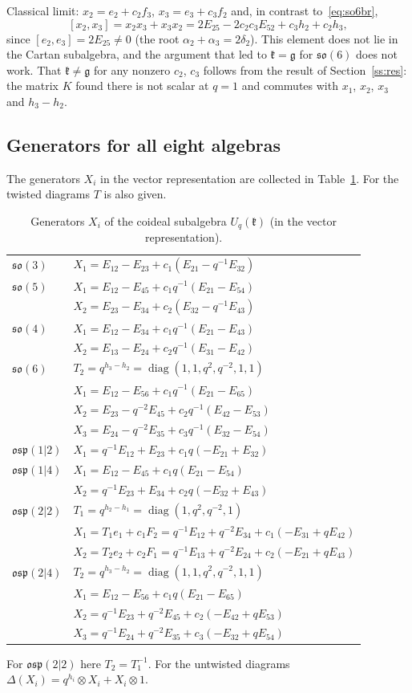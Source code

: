 \documentclass[12pt,a4paper]{article}
\newcommand{\g}{\mathfrak{g}}
\newcommand{\kk}{\mathfrak{k}}
\newcommand{\so}{\mathfrak{so}}
\newcommand{\osp}{\mathfrak{osp}}
\newcommand{\Uq}{U_q}
\newcommand{\ot}{\otimes}
\newcommand{\diag}{\operatorname{diag}}
\begin{document}
Classical limit: $x_2=e_2+c_2f_3$, $x_3=e_3+c_3f_2$ and, in contrast to~\eqref{eq:so6br},
\[
[x_2,x_3]=x_2x_3+x_3x_2=2E_{25}-2c_2c_3E_{52}+c_3h_2+c_2h_3 ,
\]
since $[e_2,e_3]=2E_{25}\neq0$ (the root $\alpha_2+\alpha_3=2\delta_2$). This element does not lie in the Cartan subalgebra, and the argument that led to $\kk=\g$ for $\so(6)$ does not work. That $\kk\neq\g$ for any nonzero $c_2$, $c_3$ follows from the result of Section~\ref{ss:res}: the matrix $K$ found there is not scalar at $q=1$ and commutes with $x_1$, $x_2$, $x_3$ and $h_3-h_2$.


\subsection{Generators for all eight algebras}
The generators $X_i$ in the vector representation are collected in Table~\ref{t:gens}. For the twisted diagrams $T$ is also
given.
\begin{table}[H]
\centering\small
\begin{tabular}{@{}ll@{}}
\toprule
$\so(3)$ & $X_1=E_{12}-E_{23}+c_1(E_{21}-q^{-1}E_{32})$\\[3pt]
$\so(5)$ & $X_1=E_{12}-E_{45}+c_1q^{-1}(E_{21}-E_{54})$\\
 & $X_2=E_{23}-E_{34}+c_2(E_{32}-q^{-1}E_{43})$\\[3pt]
$\so(4)$ & $X_1=E_{12}-E_{34}+c_1q^{-1}(E_{21}-E_{43})$\\
 & $X_2=E_{13}-E_{24}+c_2q^{-1}(E_{31}-E_{42})$\\[3pt]
$\so(6)$ & $T_2=q^{h_3-h_2}=\diag(1,1,q^2,q^{-2},1,1)$\\
 & $X_1=E_{12}-E_{56}+c_1q^{-1}(E_{21}-E_{65})$\\
 & $X_2=E_{23}-q^{-2}E_{45}+c_2q^{-1}(E_{42}-E_{53})$\\
 & $X_3=E_{24}-q^{-2}E_{35}+c_3q^{-1}(E_{32}-E_{54})$\\[3pt]
$\osp(1|2)$ & $X_1=q^{-1}E_{12}+E_{23}+c_1q(-E_{21}+E_{32})$\\[3pt]
$\osp(1|4)$ & $X_1=E_{12}-E_{45}+c_1q(E_{21}-E_{54})$\\
 & $X_2=q^{-1}E_{23}+E_{34}+c_2q(-E_{32}+E_{43})$\\[3pt]
$\osp(2|2)$ & $T_1=q^{h_2-h_1}=\diag(1,q^2,q^{-2},1)$\\
 & $X_1=T_1e_1+c_1F_2=q^{-1}E_{12}+q^{-2}E_{34}+c_1(-E_{31}+qE_{42})$\\
 & $X_2=T_2e_2+c_2F_1=q^{-1}E_{13}+q^{-2}E_{24}+c_2(-E_{21}+qE_{43})$\\[3pt]
$\osp(2|4)$ & $T_2=q^{h_3-h_2}=\diag(1,1,q^2,q^{-2},1,1)$\\
 & $X_1=E_{12}-E_{56}+c_1q(E_{21}-E_{65})$\\
 & $X_2=q^{-1}E_{23}+q^{-2}E_{45}+c_2(-E_{42}+qE_{53})$\\
 & $X_3=q^{-1}E_{24}+q^{-2}E_{35}+c_3(-E_{32}+qE_{54})$\\
\bottomrule
\end{tabular}
\caption{Generators $X_i$ of the coideal subalgebra $\Uq(\kk)$ (in the vector representation).}\label{t:gens}
\end{table}
For $\osp(2|2)$ here $T_2=T_1^{-1}$. For the untwisted diagrams $\Delta(X_i)=q^{h_i}\ot X_i+X_i\ot1$.
\end{document}
